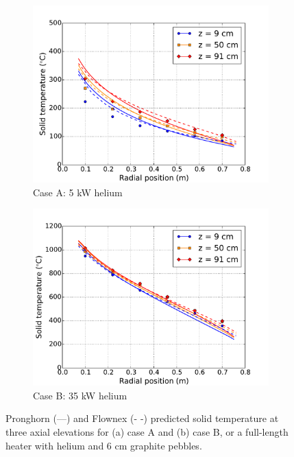 \begin{figure}[h!]
    \begin{subfigure}{0.5\linewidth}
        \centering
        \includegraphics[height=0.75\linewidth]{figs/exp_total_A.pdf}
       \caption{Case A: 5 \si{\kilo\watt} helium}
       \label{fig:helium_longa}
    \end{subfigure}
    \begin{subfigure}{0.5\linewidth}
        \centering
        \includegraphics[height=0.75\linewidth]{figs/exp_total_F.pdf}
        \caption{Case B: 35 \si{\kilo\watt} helium}
        \label{fig:helium_longb}
    \end{subfigure}
    \caption{Pronghorn (---) and Flownex (- -) predicted solid temperature at three axial elevations for (a) case A and (b) case B, or a full-length heater with helium and 6 \si{\centi\meter} graphite pebbles.}
    \label{fig:helium_long}
\end{figure}


